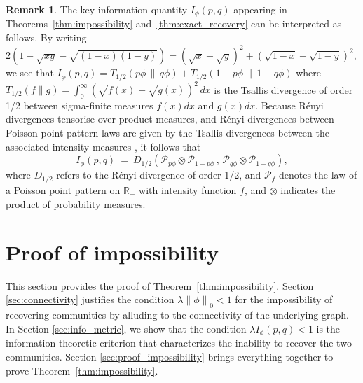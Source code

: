 \documentclass[letterpaper,11pt]{article}
\theoremstyle{definition}
\newtheorem{rem}{Remark}[section]
\def\R{\mathbb{R}}
\def\cP{\mathcal{P}}
\def\weq{ \ = \ }
\newcommand{\Renyi}{R{\'e}nyi\xspace}
\newcommand{\zeronorm}[1]{{\lVert#1\rVert}_0}
\numberwithin{equation}{section}
\newcommand{\la}{\lambda}
\theoremstyle{definition}
\newtheorem{rem}{Remark}[section]
\def\R{\mathbb{R}}
\def\cP{\mathcal{P}}
\def\weq{ \ = \ }
\newcommand{\Renyi}{R{\'e}nyi\xspace}
\newcommand{\zeronorm}[1]{{\lVert#1\rVert}_0}
\numberwithin{equation}{section}
\newcommand{\la}{\lambda}
\theoremstyle{thmstyletwo}%
\begin{document}
\begin{rem}
The key information quantity $I_\phi(p,q)$ 
appearing in Theorems~\ref{thm:impossibility} and~\ref{thm:exact_recovery}
can be interpreted as follows.
By writing
$
2( 1 - \sqrt{xy} - \sqrt{(1-x)(1-y)})
= (\sqrt{x}-\sqrt{y})^2 +  (\sqrt{1-x}-\sqrt{1-y})^2,
$
we see that
$I_\phi(p,q) = T_{1/2}( p\phi \, \| \, q\phi ) + T_{1/2}( 1-p\phi \, \| \, 1-q\phi )$
where
$T_{1/2}(f \| g) = \int_0^\infty ( \sqrt{f(x)} - \sqrt{g(x)} )^2 \, dx$
is the Tsallis divergence of order 1/2 between sigma-finite measures $f(x) dx$ and $g(x)dx$.
Because \Renyi divergences tensorise over product measures,
and \Renyi divergences between Poisson point pattern laws
are given by the Tsallis divergences between the associated intensity measures
\cite[Theorem 5]{Leskela_2024},
it follows that
\[
 I_\phi(p,q)
 \weq D_{1/2}( \cP_{p\phi} \otimes \cP_{1-p\phi} \, , \, \cP_{q\phi} \otimes \cP_{1-q\phi} ),
\]
where $D_{1/2}$ refers to the \Renyi divergence of order 1/2,
and $\cP_f$ denotes the law of a Poisson point pattern on $\R_+$
with intensity function $f$, and $\otimes$ indicates the product of probability measures.
\end{rem}


\section{Proof of impossibility}
\label{sec:impossibility}

This section provides 
the proof of Theorem~\ref{thm:impossibility}. Section \ref{sec:connectivity} justifies the condition $\la \zeronorm{\phi} <1$ for the impossibility of recovering communities by alluding to the connectivity of the underlying graph. In Section \ref{sec:info_metric}, we show that the condition $\la I_\phi(p,q) <1$ is the information-theoretic criterion that characterizes the inability to recover the two communities. Section \ref{sec:proof_impossibility} brings everything together to prove Theorem~\ref{thm:impossibility}.
\end{document}
